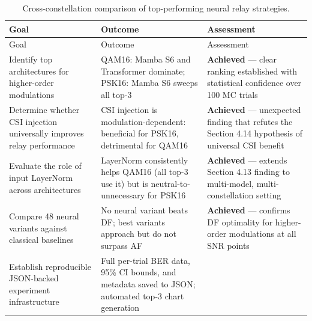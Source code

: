 \documentclass[
  english,
  12pt,
  12pt,
  a4paper,
  oneside]{report}
\begin{document}
\begin{longtable}[]{@{}
  >{\raggedright\arraybackslash}p{}
  >{\raggedright\arraybackslash}p{}
  >{\raggedright\arraybackslash}p{}@{}}
\caption{Cross-constellation comparison of top-performing neural relay strategies.}\label{tbl:table21}\tabularnewline
\toprule\noalign{}
\begin{minipage}[b]{\linewidth}\raggedright
Goal
\end{minipage} & \begin{minipage}[b]{\linewidth}\raggedright
Outcome
\end{minipage} & \begin{minipage}[b]{\linewidth}\raggedright
Assessment
\end{minipage} \\
\midrule\noalign{}
\endfirsthead
\toprule\noalign{}
\begin{minipage}[b]{\linewidth}\raggedright
Goal
\end{minipage} & \begin{minipage}[b]{\linewidth}\raggedright
Outcome
\end{minipage} & \begin{minipage}[b]{\linewidth}\raggedright
Assessment
\end{minipage} \\
\midrule\noalign{}
\endhead
\bottomrule\noalign{}
\endlastfoot
Identify top architectures for higher-order modulations & QAM16: Mamba S6 and Transformer dominate; PSK16: Mamba S6 sweeps all top-3 & \textbf{Achieved} --- clear ranking established with statistical confidence over 100 MC trials \\
Determine whether CSI injection universally improves relay performance & CSI injection is modulation-dependent: beneficial for PSK16, detrimental for QAM16 & \textbf{Achieved} --- unexpected finding that refutes the Section 4.14 hypothesis of universal CSI benefit \\
Evaluate the role of input LayerNorm across architectures & LayerNorm consistently helps QAM16 (all top-3 use it) but is neutral-to-unnecessary for PSK16 & \textbf{Achieved} --- extends Section 4.13 finding to multi-model, multi-constellation setting \\
Compare 48 neural variants against classical baselines & No neural variant beats DF; best variants approach but do not surpass AF & \textbf{Achieved} --- confirms DF optimality for higher-order modulations at all SNR points \\
Establish reproducible JSON-backed experiment infrastructure & Full per-trial BER data, 95\% CI bounds, and metadata saved to JSON; automated top-3 chart generation & \\
\end{longtable}
\end{document}
